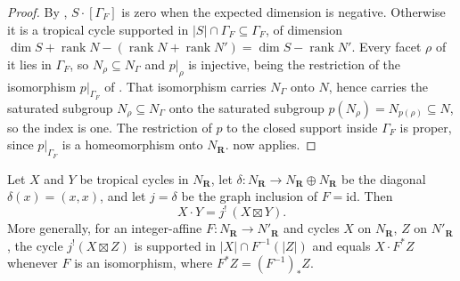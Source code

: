 \begin{proof}
By , $S\cdot[\Gamma_F]$ is zero when
the expected dimension is negative.  Otherwise it is a tropical cycle
supported in $|S|\cap\Gamma_F\subseteq\Gamma_F$, of dimension
$\dim S+\operatorname{rank}N-(\operatorname{rank}N+\operatorname{rank}N')
=\dim S-\operatorname{rank}N'$.  Every facet $\rho$ of it lies in
$\Gamma_F$, so $N_\rho\subseteq N_\Gamma$ and $p|_\rho$ is injective, being
the restriction of the isomorphism $p|_{\Gamma_F}$ of
.  That isomorphism carries $N_\Gamma$ onto $N$,
hence carries the saturated subgroup $N_\rho\subseteq N_\Gamma$ onto the
saturated subgroup $p(N_\rho)=N_{p(\rho)}\subseteq N$, so the index is one.
The restriction of $p$ to the closed support inside $\Gamma_F$ is proper,
since $p|_{\Gamma_F}$ is a homeomorphism onto $N_{\mathbf R}$.
 now applies.
\end{proof}

\begin{theorem}
\label{thm:ch10-diagonal-gysin}
Let $X$ and $Y$ be tropical cycles in $N_{\mathbf R}$, let
$\delta:N_{\mathbf R}\to N_{\mathbf R}\oplus N_{\mathbf R}$ be the diagonal
$\delta(x)=(x,x)$, and let $j=\delta$ be the graph inclusion of
$F=\mathrm{id}$.  Then
\[
 X\cdot Y=j^!\,(X\boxtimes Y).
\]
More generally, for an integer-affine $F:N_{\mathbf R}\to N'_{\mathbf R}$ and
cycles $X$ on $N_{\mathbf R}$, $Z$ on $N'_{\mathbf R}$, the cycle
$j^!(X\boxtimes Z)$ is supported in $|X|\cap F^{-1}(|Z|)$ and equals
$X\cdot F^*Z$ whenever $F$ is an isomorphism, where
$F^*Z=(F^{-1})_*Z$.
\end{theorem}

